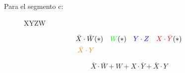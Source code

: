 Para el segmento c:
\begin{figure}[H]
  \centering
    \begin{Karnaugh}{X}{Y}{Z}{W}
    \end{Karnaugh}
\end{figure}

\begin{align*}
  \bar{X} \cdot \bar{W} & (*) &
  \color{green} W & (*) &
  \color{blue} Y \cdot Z & &
  \color{red} X \cdot \bar{Y} & (*) \\
  \color{orange} \bar{X}\cdot Y
  \color{black}
\end{align*}

\begin{equation*}
  \bar{X} \cdot \bar{W} +
  W +
  X \cdot \bar{Y} +
  \bar{X}\cdot Y
\end{equation*}
